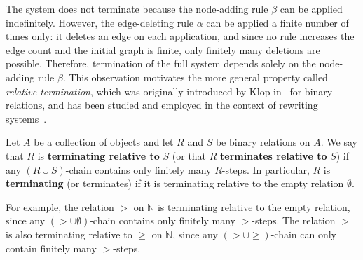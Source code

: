 \begin{figure}[H]
{{
            }
        }
    \caption{}
    \label{fig:intro:edge_deletion_and_node_addition_ruledfakdsjflsdaj}
  \end{figure}
The system does not terminate because the node-adding rule $\beta$ can be applied indefinitely. However, the edge-deleting rule $\alpha$ can be applied a finite number of times only: it deletes an edge on each application, and since no rule increases the edge count and the initial graph is finite, only finitely many deletions are possible. Therefore, termination of the full system depends solely on the node-adding rule $\beta$. This observation motivates the more general property called \emph{relative termination}, which was originally introduced by Klop in~\cite{klop1987term} for binary relations, and has been studied and employed in the context of rewriting systems~\cite{geser1990relative,kassing2024dependency,endrullis2024generalized_icgt,zantema2014termination,bruggink2014termination,bruggink2015proving}. 

\begin{definition}
Let $A$ be a collection of objects and let $R$ and $S$ be binary relations on $A$. 
We say that $R$ is \textbf{terminating relative to} $S$ (or that $R$ \textbf{terminates relative to} $S$) if 
any $(R \cup S)$-chain contains only finitely many $R$-steps.
In particular, $R$ is \textbf{terminating} (or terminates) if it is terminating relative to the empty relation $\emptyset$.
\end{definition}

For example, the relation $>$ on $\mathbb{N}$ is terminating relative to the empty relation, since any $(> \cup \emptyset)$-chain contains only finitely many $>$-steps. The relation $>$ is also terminating relative to $\geq$ on $\mathbb{N}$, since any $(> \cup \geq)$-chain can only contain finitely many $>$-steps.


